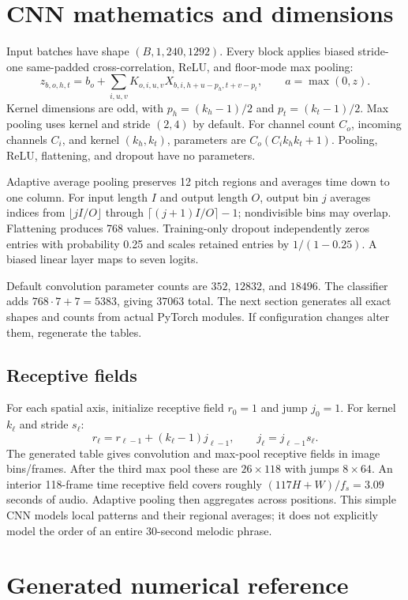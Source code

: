 \documentclass[11pt,a4paper]{article}
\begin{document}
\section{CNN mathematics and dimensions}
Input batches have shape $(B,1,240,1292)$. Every block applies biased stride-one
same-padded cross-correlation, ReLU, and floor-mode max pooling:
\[
z_{b,o,h,t}=b_o+\sum_{i,u,v}K_{o,i,u,v}X_{b,i,h+u-p_h,t+v-p_t},\qquad
a=\max(0,z).
\]
Kernel dimensions are odd, with $p_h=(k_h-1)/2$ and $p_t=(k_t-1)/2$.
Max pooling uses kernel and stride $(2,4)$ by default. For channel count $C_o$,
incoming channels $C_i$, and kernel $(k_h,k_t)$, parameters are
$C_o(C_i k_h k_t+1)$. Pooling, ReLU, flattening, and dropout have no parameters.

Adaptive average pooling preserves 12 pitch regions and averages time down to
one column. For input length $I$ and output length $O$, output bin $j$ averages
indices from $\lfloor jI/O\rfloor$ through $\lceil(j+1)I/O\rceil-1$;
nondivisible bins may overlap. Flattening produces 768 values. Training-only
dropout independently zeros entries with probability 0.25 and scales retained
entries by $1/(1-0.25)$. A biased linear layer maps to seven logits.

Default convolution parameter counts are $352$, $12832$, and $18496$.
The classifier adds $768\cdot7+7=5383$, giving $37063$ total.
The next section generates all exact shapes and counts from actual PyTorch
modules. If configuration changes alter them, regenerate the tables.

\subsection{Receptive fields}
For each spatial axis, initialize receptive field $r_0=1$ and jump $j_0=1$.
For kernel $k_\ell$ and stride $s_\ell$:
\[
r_\ell=r_{\ell-1}+(k_\ell-1)j_{\ell-1},\qquad
j_\ell=j_{\ell-1}s_\ell.
\]
The generated table gives convolution and max-pool receptive fields in image
bins/frames. After the third max pool these are $26\times118$ with jumps
$8\times64$. An interior 118-frame time receptive field covers roughly
$(117H+W)/f_s=3.09$ seconds of audio. Adaptive pooling then aggregates across
positions. This simple CNN models local patterns and their regional averages;
it does not explicitly model the order of an entire 30-second melodic phrase.

\section{Generated numerical reference}

\end{document}
